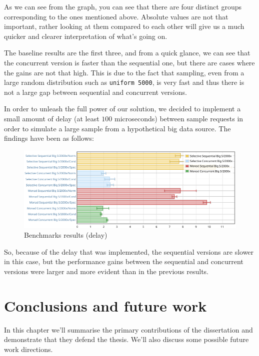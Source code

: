 \documentclass[
  oneside,
  11pt, a4paper,
  footinclude=true,
  headinclude=true,
  cleardoublepage=empty
]{scrbook}
\theoremstyle{definition}
\theoremstyle{definition}
\begin{document}
    As we can see from the graph, you can see that there are four distinct groups corresponding to the ones mentioned above. Absolute values are not that important, rather looking at them compared to each other will give us a much quicker and clearer interpretation of what's going on.
    
    The baseline results are the first three, and from a quick glance, we can see that the concurrent version is faster than the sequential one, but there are cases where the gains are not that high. This is due to the fact that sampling, even from a large random distribution such as \texttt{uniform 5000}, is very fast and thus there is not a large gap between sequential and concurrent versions.
    
    In order to unleash the full power of our solution, we decided to implement a small amount of delay (at least $100$ microseconds) between sample requests in order to simulate a large sample from a hypothetical big data source. The findings have been as follows:
    
    \begin{figure}[H]
        \centering
        \includegraphics[width=\linewidth]{img/delay.pdf}
        \caption{Benchmarks results (delay)}
        \label{fig:delay}
    \end{figure}
    
    So, because of the delay that was implemented, the sequential versions are slower in this case, but the performance gains between the sequential and concurrent versions were larger and more evident than in the previous results.
        
	\chapter{Conclusions and future work}\label{ch-conclusion}
	    In this chapter we’ll summarise the primary contributions of the dissertation and demonstrate that they defend the thesis. We'll also discuss some possible future work directions.
	
\end{document}
